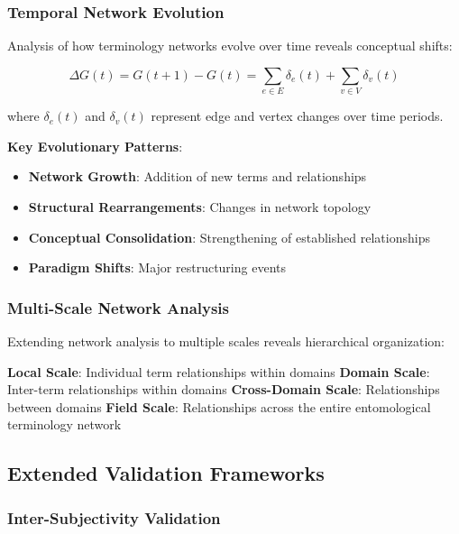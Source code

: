 \documentclass[
]{article}
\providecommand{\tightlist}{%
  \setlength{\itemsep}{0pt}\setlength{\parskip}{0pt}}
\numberwithin{equation}{section}
\begin{document}
\subsubsection{Temporal Network
Evolution}\label{temporal-network-evolution}

Analysis of how terminology networks evolve over time reveals conceptual
shifts:

\begin{equation}\label{eq:temporal_network_evolution}
\Delta G(t) = G(t+1) - G(t) = \sum_{e \in E} \delta_e(t) + \sum_{v \in V} \delta_v(t)
\end{equation}

where \(\delta_e(t)\) and \(\delta_v(t)\) represent edge and vertex
changes over time periods.

\textbf{Key Evolutionary Patterns}:

\begin{itemize}
\tightlist
\item
  \textbf{Network Growth}: Addition of new terms and relationships
\item
  \textbf{Structural Rearrangements}: Changes in network topology
\item
  \textbf{Conceptual Consolidation}: Strengthening of established
  relationships
\item
  \textbf{Paradigm Shifts}: Major restructuring events
\end{itemize}

\subsubsection{Multi-Scale Network
Analysis}\label{multi-scale-network-analysis}

Extending network analysis to multiple scales reveals hierarchical
organization:

\textbf{Local Scale}: Individual term relationships within domains
\textbf{Domain Scale}: Inter-term relationships within domains
\textbf{Cross-Domain Scale}: Relationships between domains \textbf{Field
Scale}: Relationships across the entire entomological terminology
network

\subsection{Extended Validation
Frameworks}\label{extended-validation-frameworks}

\subsubsection{Inter-Subjectivity
Validation}\label{inter-subjectivity-validation}
\end{document}
